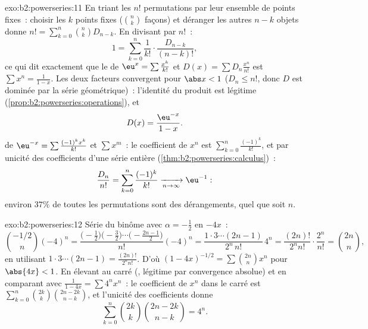 \begin{solution}{exo:b2:powerseries:11}
En triant les $n!$ permutations par leur ensemble de points fixes~: choisir
les $k$ points fixes ($\binom nk$ façons) et déranger les autres
$n - k$ objets donne $n! = \sum_{k=0}^n\binom nk D_{n-k}$.
En divisant par $n!$~:
\[
1 = \sum_{k=0}^{n}\frac{1}{k!}\cdot\frac{D_{n-k}}{(n-k)!} ,
\]
ce qui dit exactement que le  de $\eu^x =
\sum\frac{x^k}{k!}$ et $D(x) = \sum D_n\frac{x^n}{n!}$ est
$\sum x^n = \frac{1}{1-x}$. Les deux facteurs convergent 
pour $\abs x < 1$ ($D_n \leq n!$, donc $D$ est dominée par la
série géométrique)~: l'identité du produit est légitime
(\cref{prop:b2:powerseries:operations}), et
\[
D(x) = \frac{\eu^{-x}}{1-x} .
\]
 de $\eu^{-x} = \sum\frac{(-1)^kx^k}{k!}$ et
$\sum x^m$~: le coefficient de $x^n$ est
$\sum_{k=0}^{n}\frac{(-1)^k}{k!}$, et par unicité des coefficients
d'une série entière (\cref{thm:b2:powerseries:calculus})~:
\[
\frac{D_n}{n!} = \sum_{k=0}^{n}\frac{(-1)^k}{k!}
\xrightarrow[n\to\infty]{} \eu^{-1} :
\]
environ $37\%$ de toutes les permutations sont des dérangements, quel que soit
$n$.
\end{solution}

\begin{solution}{exo:b2:powerseries:12}
Série du binôme avec $\alpha = -\frac12$ en $-4x$~:
\[
\binom{-1/2}{n}(-4)^n
= \frac{\bigl(-\frac12\bigr)\bigl(-\frac32\bigr)\cdots
\bigl(-\frac{2n-1}2\bigr)}{n!}(-4)^n
= \frac{1\cdot3\cdots(2n-1)}{2^n\,n!}\,4^n
= \frac{(2n)!}{2^n n!}\cdot\frac{2^n}{n!}
= \binom{2n}{n},
\]
en utilisant $1\cdot3\cdots(2n-1) = \frac{(2n)!}{2^nn!}$. D'où
$(1-4x)^{-1/2} = \sum\binom{2n}nx^n$ pour $\abs{4x} < 1$.
En élevant au carré (, légitime par convergence absolue)
et en comparant avec $\frac{1}{1-4x} = \sum 4^nx^n$~: le
coefficient de $x^n$ dans le carré est
$\sum_{k=0}^n\binom{2k}k\binom{2n-2k}{n-k}$, et l'unicité des
coefficients donne
\[
\sum_{k=0}^{n}\binom{2k}{k}\binom{2n-2k}{n-k} = 4^n .
\]
\end{solution}

